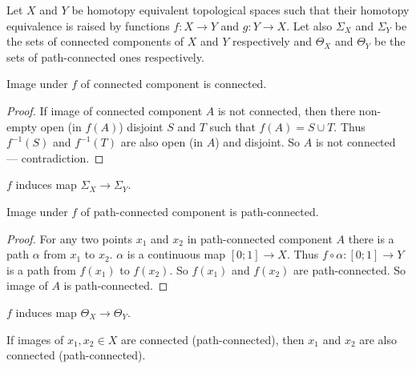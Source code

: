 \documentclass[12pt,a4paper]{article}
\begin{document}
    \begin{enumproblem}
        Let $X$ and $Y$ be homotopy equivalent topological spaces such that their homotopy equivalence is raised by functions $f: X \to Y$ and $g: Y \to X$. Let also $\Sigma_X$ and $\Sigma_Y$ be the sets of connected components of $X$ and $Y$ respectively and $\Theta_X$ and $\Theta_Y$ be the sets of path-connected ones respectively.

        \begin{lemma}\label{connection-of-connected-component-lemma}
            Image under $f$ of connected component is connected.
        \end{lemma}

        \begin{proof}
            If image of connected component $A$ is not connected, then there non-empty open (in $f(A)$) disjoint $S$ and $T$ such that $f(A) = S \cup T$. Thus $f^{-1}(S)$ and $f^{-1}(T)$ are also open (in $A$) and disjoint. So $A$ is not connected --- contradiction.
        \end{proof}

        \begin{corollary}
            $f$ induces map $\Sigma_X \to \Sigma_Y$.
        \end{corollary}

        \begin{lemma}\label{path-connection-of-path-connected-component-lemma}
            Image under $f$ of path-connected component is path-connected.
        \end{lemma}

        \begin{proof}
            For any two points $x_1$ and $x_2$ in path-connected component $A$ there is a path $\alpha$ from $x_1$ to $x_2$. $\alpha$ is a continuous map $[0; 1] \to X$. Thus $f \circ \alpha: [0; 1] \to Y$ is a path from $f(x_1)$ to $f(x_2)$. So $f(x_1)$ and $f(x_2)$ are path-connected. So image of $A$ is path-connected.
        \end{proof}

        \begin{corollary}
            $f$ induces map $\Theta_X \to \Theta_Y$.
        \end{corollary}

        \begin{lemma}
            If images of $x_1, x_2 \in X$ are connected (path-connected), then $x_1$ and $x_2$ are also connected (path-connected).
        \end{lemma}


\end{enumproblem}
\end{document}
